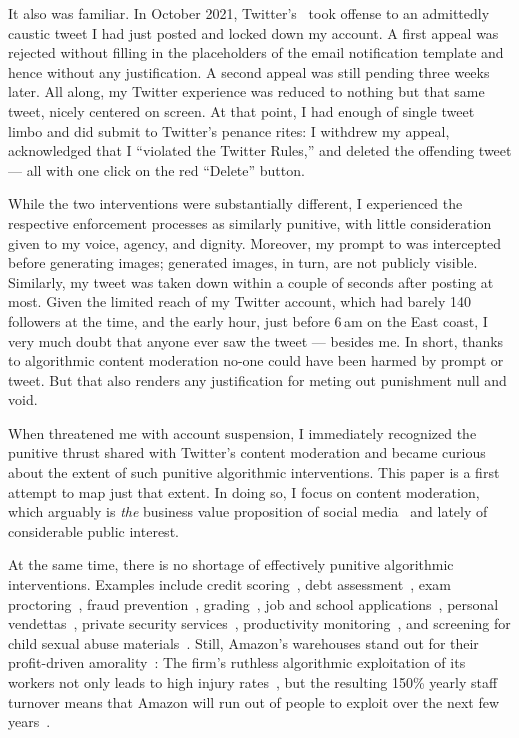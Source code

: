 It also was familiar. In October 2021, Twitter's \AI\ took offense to an
admittedly caustic tweet I had just posted and locked down my account. A first
appeal was rejected without filling in the placeholders of the email
notification template and hence without any justification. A second appeal was
still pending three weeks later. All along, my Twitter experience was reduced to
nothing but that same tweet, nicely centered on screen. At that point, I had
enough of single tweet limbo and did submit to Twitter's penance rites: I
withdrew my appeal, acknowledged that I ``violated the Twitter Rules,'' and
deleted the offending tweet --- all with one click on the red ``Delete'' button.

While the two interventions were substantially different, I experienced the
respective enforcement processes as similarly punitive, with little
consideration given to my voice, agency, and dignity. Moreover, my prompt to
\DALLE{} was intercepted before generating images; generated images, in turn, are
not publicly visible. Similarly, my tweet was taken down within a couple of
seconds after posting at most. Given the limited reach of my Twitter account,
which had barely 140 followers at the time, and the early hour, just before
6$\,$am on the East coast, I very much doubt that anyone ever saw the tweet ---
besides me. In short, thanks to algorithmic content moderation no-one could have
been harmed by prompt or tweet. But that also renders any justification for
meting out punishment null and void.

When \DALLE{} threatened me with account suspension, I immediately recognized
the punitive thrust shared with Twitter's content moderation and became curious
about the extent of such punitive algorithmic interventions. This paper is a
first attempt to map just that extent. In doing so, I focus on content
moderation, which arguably is \emph{the} business value proposition of social
media~\cite{Masnick2022a,Patel2022a} and lately of considerable public interest.

At the same time, there is no shortage of effectively punitive algorithmic
interventions. Examples include credit scoring~\cite{Anonymous2018}, debt
assessment~\cite{Yampolskiy2015}, exam proctoring~\cite{FrancisWard2021b}, fraud
prevention~\cite{Kugel2022}, grading~\cite{Lam2020}, job and school
applications~\cite{Anonymous2016,Hall2012,Hall2020a,Stockton2020}, personal
vendettas~\cite{Casovan2022}, private security services~\cite{HaoSwart2022},
productivity
monitoring~\cite{Covert2022,HaoFreischlad2022,KantorSundaramea2022,Rosenblat2018},
and screening for child sexual abuse materials~\cite{Atherton2022a}. Still,
Amazon's warehouses stand out for their profit-driven
amorality~\cite{KantorWeiseea2021,Lennard2020}: The firm's ruthless algorithmic
exploitation of its workers not only leads to high injury
rates~\cite{Brown2019a,Clark2023,Sainato2021}, but the resulting 150\% yearly
staff turnover means that Amazon will run out of people to exploit over the next
few years~\cite{Sainato2022}.

